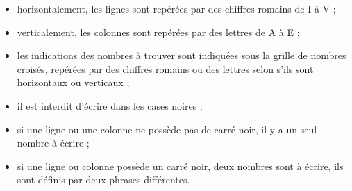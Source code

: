 \phantom{\numeroteEnigme}
\begin{enigme}    
      \begin{itemize}
         \item horizontalement, les lignes sont repérées par des chiffres romains de I à V ;
         \item verticalement, les colonnes sont repérées par des lettres de A à E ;
         \item les indications des nombres à trouver sont indiquées sous la grille de nombres croisés, repérées par des chiffres romains ou des lettres selon s'ils sont horizontaux ou verticaux ;
         \item il est interdit d'écrire dans les cases noires ;
         \item si une ligne ou une colonne ne possède pas de carré noir, il y a un seul nombre à écrire ;
         \item si une ligne ou colonne possède un carré noir, deux nombres sont à écrire, ils sont définis par deux phrases différentes. \\
      \end{itemize}
   

\end{enigme}
